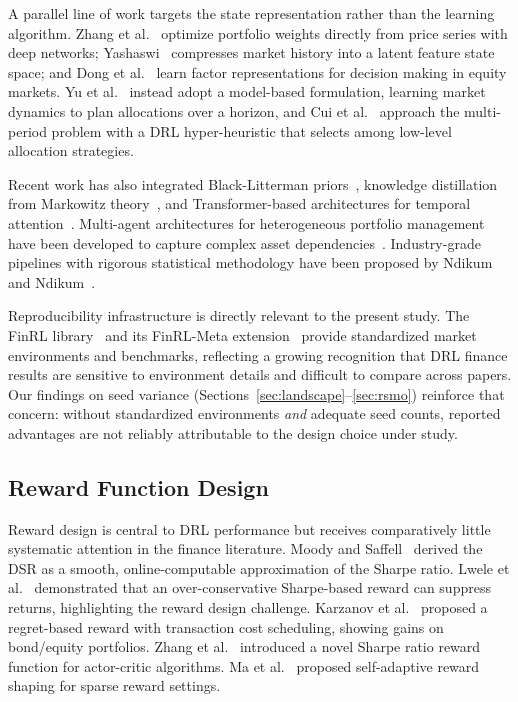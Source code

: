 \documentclass[conference]{IEEEtran}
\begin{document}
A parallel line of work targets the state representation rather than the
learning algorithm. Zhang et al.~\cite{Zhang2020DLPortfolio} optimize portfolio
weights directly from price series with deep networks; Yashaswi~\cite{Yashaswi2021LFSS}
compresses market history into a latent feature state space; and Dong et
al.~\cite{Dong2021Factor} learn factor representations for decision making in
equity markets. Yu et al.~\cite{Yu2019ModelBased} instead adopt a model-based
formulation, learning market dynamics to plan allocations over a horizon, and
Cui et al.~\cite{Cui2024HyperHeuristic} approach the multi-period problem with a
DRL hyper-heuristic that selects among low-level allocation strategies.

Recent work has also integrated Black-Litterman priors~\cite{Sun2024BlackLitterman},
knowledge distillation from Markowitz theory~\cite{Hu2024Markowitz}, and
Transformer-based architectures for temporal attention~\cite{Xue2025Attention}.
Multi-agent architectures for heterogeneous portfolio management have been
developed to capture complex asset dependencies~\cite{Zhang2025GraphRL}.
Industry-grade pipelines with rigorous statistical methodology have been proposed
by Ndikum and Ndikum~\cite{Ndikum2024Industry}.

Reproducibility infrastructure is directly relevant to the present study. The
FinRL library~\cite{Liu2020FinRL} and its FinRL-Meta
extension~\cite{Liu2021FinRLMeta} provide standardized market environments and
benchmarks, reflecting a growing recognition that DRL finance results are
sensitive to environment details and difficult to compare across papers. Our
findings on seed variance (Sections~\ref{sec:landscape}--\ref{sec:rsmo})
reinforce that concern: without standardized environments \emph{and} adequate
seed counts, reported advantages are not reliably attributable to the design
choice under study.

\subsection{Reward Function Design}
Reward design is central to DRL performance but receives comparatively little
systematic attention in the finance literature. Moody and Saffell~\cite{Moody2001}
derived the DSR as a smooth, online-computable approximation of the Sharpe ratio.
Lwele et al.~\cite{Lwele2025RiskAware} demonstrated that an over-conservative
Sharpe-based reward can suppress returns, highlighting the reward design
challenge. Karzanov et al.~\cite{Karzanov2025Regret} proposed a regret-based
reward with transaction cost scheduling, showing gains on bond/equity portfolios.
Zhang et al.~\cite{Huang2025DRLChina} introduced a novel Sharpe ratio reward
function for actor-critic algorithms. Ma et al.~\cite{Ma2025SelfAdaptiveReward}
proposed self-adaptive reward shaping for sparse reward settings.
\end{document}
